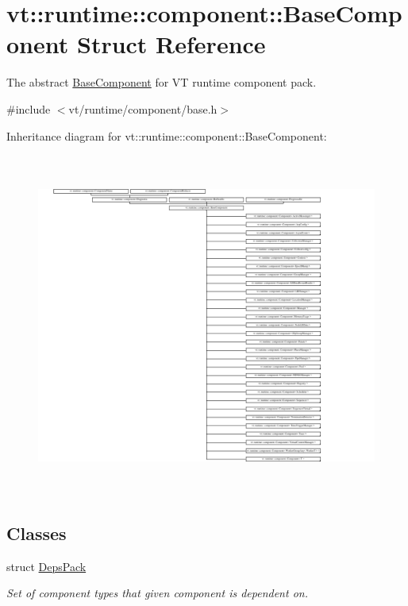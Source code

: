\hypertarget{structvt_1_1runtime_1_1component_1_1_base_component}{}\section{vt\+:\+:runtime\+:\+:component\+:\+:Base\+Component Struct Reference}
\label{structvt_1_1runtime_1_1component_1_1_base_component}


The abstract {\ttfamily \hyperlink{structvt_1_1runtime_1_1component_1_1_base_component}{Base\+Component}} for VT runtime component pack.  




{\ttfamily \#include $<$vt/runtime/component/base.\+h$>$}

Inheritance diagram for vt\+:\+:runtime\+:\+:component\+:\+:Base\+Component\+:\begin{figure}[H]
\begin{center}
\leavevmode
\includegraphics[height=11.323529cm]{structvt_1_1runtime_1_1component_1_1_base_component}
\end{center}
\end{figure}
\subsection*{Classes}
\begin{DoxyCompactItemize}
\item 
struct \hyperlink{structvt_1_1runtime_1_1component_1_1_base_component_1_1_deps_pack}{Deps\+Pack}
\begin{DoxyCompactList}\small\item\em Set of component types that given component is dependent on. \end{DoxyCompactList}\end{DoxyCompactItemize}
